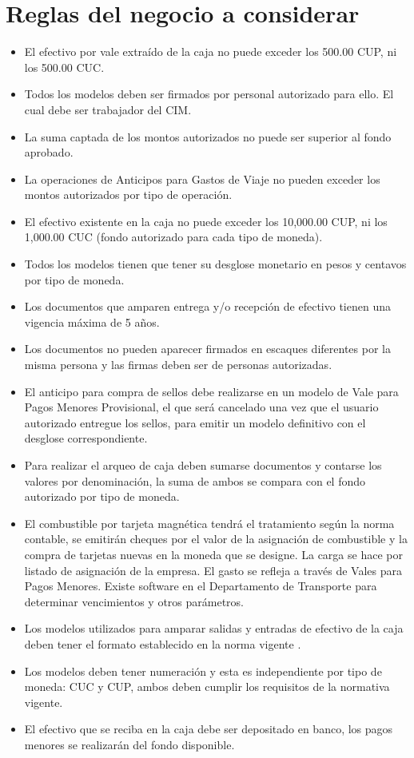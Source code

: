 \section{Reglas del negocio a considerar}
\begin{itemize}
	\item El efectivo por vale extraído de la caja no puede exceder los 500.00 CUP, ni los 500.00 CUC.
	\item Todos los modelos deben ser firmados por personal autorizado para ello. El cual debe ser trabajador del CIM.
	\item La suma captada de los montos autorizados no puede ser superior al fondo aprobado.
	\item La operaciones de Anticipos para Gastos de Viaje no pueden exceder los montos autorizados por tipo de operaci\'{o}n.
	\item El efectivo existente en la caja no puede exceder los 10,000.00 CUP, ni los 1,000.00 CUC (fondo autorizado para cada tipo de moneda).
	\item Todos los modelos tienen que tener su desglose monetario en pesos y centavos por tipo de moneda.
	\item Los documentos que amparen entrega y/o recepci\'{o}n de efectivo tienen una vigencia m\'{a}xima de 5 años.
	\item Los documentos no pueden aparecer firmados en escaques diferentes por la misma persona y las firmas deben ser de personas autorizadas.
	\item El anticipo para compra de sellos debe realizarse en un modelo de Vale para Pagos Menores Provisional, el que será cancelado una vez que el usuario 	autorizado entregue los sellos, para emitir un modelo definitivo con el 	desglose correspondiente.
	\item Para realizar el arqueo de caja deben sumarse documentos y contarse los 	valores por denominación, la suma de ambos se compara con el fondo autorizado por tipo de moneda.
	\item El combustible por tarjeta magnética tendrá el tratamiento según la norma contable, se emitirán cheques por el valor de la asignación de combustible y	la compra de tarjetas nuevas en la moneda que se designe. La carga se hace por listado de asignación de la empresa. El gasto se refleja a través de Vales	para Pagos Menores. Existe software en el Departamento de Transporte para	determinar vencimientos y otros parámetros.
	\item Los modelos utilizados para amparar salidas y entradas de efectivo de la caja deben tener el formato establecido en la norma vigente \cite{noauthor_resolucion_2007}.
	\item Los modelos deben tener numeración y esta es independiente por tipo de 	moneda: CUC y CUP, ambos deben cumplir los requisitos de la normativa vigente.
	\item El efectivo que se reciba en la caja debe ser depositado en banco, los pagos menores se realizarán del fondo disponible.
\end{itemize}

